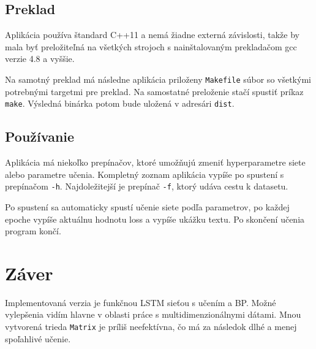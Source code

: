 \documentclass[12pt,a4paper]{article}
\begin{document}
	\subsection{Preklad}
	Aplikácia používa štandard C++11 a nemá žiadne externá závislosti, takže by mala byť preložiteľná na všetkých strojoch s nainštalovaným prekladačom gcc verzie 4.8 a vyššie.
		
	Na samotný preklad má následne aplikácia priloženy \texttt{Makefile} súbor so všetkými potrebnými targetmi pre preklad. Na samostatné preloženie stačí spustiť príkaz \texttt{make}. Výsledná binárka potom bude uložená v adresári \texttt{dist}.

	\subsection{Používanie}	
	Aplikácia má niekoľko prepínačov, ktoré umožňujú zmeniť hyperparametre siete alebo parametre učenia. Kompletný zoznam aplikácia vypíše po spustení s prepínačom \texttt{-h}. Najdoležitejší je prepínač \texttt{-f}, ktorý udáva cestu k datasetu.
	
	Po spustení sa automaticky spustí učenie siete podľa parametrov, po každej epoche vypíše aktuálnu hodnotu loss a vypíše ukážku textu. Po skončení učenia program končí.
	

\section{Záver}
Implementovaná verzia je funkčnou LSTM sieťou s učením a BP. Možné vylepšenia vidím hlavne v oblasti práce s multidimenzionálnymi dátami. Mnou vytvorená trieda \texttt{Matrix} je príliš neefektívna, čo má za následok dlhé a menej spoľahlivé učenie.


\end{document}
